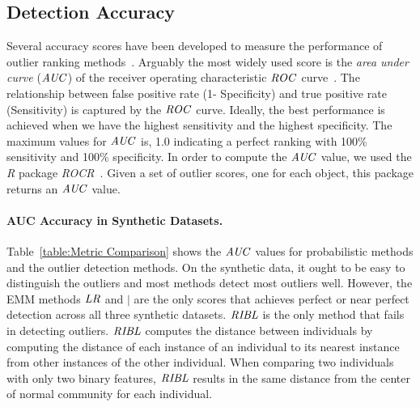 {\subsection{Detection Accuracy} \label{sec:detection} Several accuracy scores have been developed to measure the performance of outlier ranking methods~\citep{aggarwal2013}. Arguably the most widely used score is the {\em area under curve} ($\it{AUC}$) of the receiver operating characteristic $\it{ROC}$ curve~\citep{Fawcett2006,Cansado2008,Muller2012}. 
		The relationship between false positive rate (1- Specificity) and true positive rate (Sensitivity) is captured by the $\it{ROC}$ curve. Ideally, the best performance is achieved when we have the highest sensitivity and the highest specificity. 
		The maximum values for $\it{AUC}$ is, 1.0 indicating a perfect ranking with 100\% sensitivity and 100\% specificity. In order to compute the $\it{AUC}$ value, we used the \textit{R} package \textit{ROCR}~\citep{RROCR2012}. Given a set of outlier scores, one for each object, this package returns an $\it{AUC}$ value. 



	\paragraph{AUC Accuracy in Synthetic Datasets.}
	Table~\ref{table:Metric Comparison} shows the $\it{AUC}$ values for probabilistic methods and the outlier detection methods. On the synthetic data, it ought to be easy to distinguish the outliers and most methods detect most outliers well.  However, the EMM methods $\it{LR}$ and $\mid$ are the only scores that achieves perfect or near perfect detection across all three synthetic datasets. $\it{RIBL}$ is the only method that fails in detecting outliers. $\it{RIBL}$ computes the distance between individuals by computing the distance of each instance of an individual to its nearest instance from other instances of the other individual. When comparing two individuals with only two binary features, $\it{RIBL}$ results in the same distance from the center of normal community for each individual.
	
}

